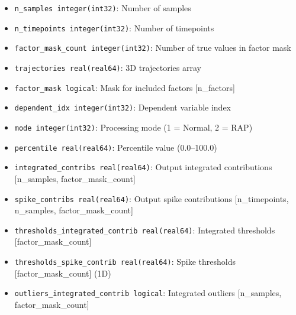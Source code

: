 \documentclass[11pt]{article}
\begin{document}
\begin{enumerate}
\begin{enumerate}
\begin{itemize}
	      	      	\item \texttt{n\_samples integer(int32)}: Number of samples
	      	      	      
	      	      	\item \texttt{n\_timepoints integer(int32)}: Number of timepoints
	      	      	      
	      	      	\item \texttt{factor\_mask\_count integer(int32)}: Number of true values
	      	      	      in factor mask
	      	      	      
	      	      	\item \texttt{trajectories real(real64)}: 3D trajectories array
	      	      	      
	      	      	\item \texttt{factor\_mask logical}: Mask for included factors [n\_factors]
	      	      	      
	      	      	\item \texttt{dependent\_idx integer(int32)}: Dependent variable index
	      	      	      
	      	      	\item \texttt{mode integer(int32)}: Processing mode (1 = Normal, 2 =
	      	      	      RAP)
	      	      	      
	      	      	\item \texttt{percentile real(real64)}: Percentile value (0.0--100.0)
	      	      	      
	      	      	\item \texttt{integrated\_contribs real(real64)}: Output integrated contributions
	      	      	      [n\_samples, factor\_mask\_count]
	      	      	      
	      	      	\item \texttt{spike\_contribs real(real64)}: Output spike contributions
	      	      	      [n\_timepoints, n\_samples, factor\_mask\_count]
	      	      	      
	      	      	\item \texttt{thresholds\_integrated\_contrib real(real64)}: Integrated
	      	      	      thresholds [factor\_mask\_count]
	      	      	      
	      	      	\item \texttt{thresholds\_spike\_contrib real(real64)}: Spike thresholds
	      	      	      [factor\_mask\_count] (1D)
	      	      	      
	      	      	\item \texttt{outliers\_integrated\_contrib logical}: Integrated outliers
	      	      	      [n\_samples, factor\_mask\_count]
	      	      	      

\end{itemize}
\end{enumerate}
\end{enumerate}
\end{document}
